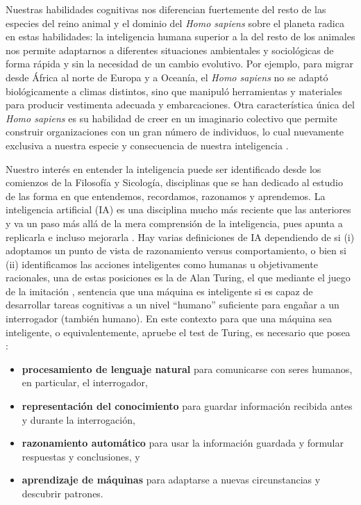 Nuestras habilidades cognitivas nos diferencian fuertemente del resto de las especies del reino animal y el dominio del \emph{Homo sapiens} sobre el planeta radica en estas habilidades: la inteligencia humana superior a la del resto de los animales nos permite adaptarnos a diferentes situaciones ambientales y sociológicas de forma rápida y sin la necesidad de un cambio evolutivo. Por ejemplo, para migrar desde África al norte de Europa y a Oceanía, el \emph{Homo sapiens} no se adaptó biológicamente a climas distintos, sino que manipuló herramientas y materiales para producir vestimenta adecuada y embarcaciones. Otra característica única del \emph{Homo sapiens} es su habilidad de creer en un imaginario colectivo que permite construir organizaciones con un gran número de individuos, lo cual nuevamente exclusiva a nuestra especie y consecuencia de nuestra inteligencia \cite{harari}. 

Nuestro interés en entender la inteligencia puede ser identificado desde los comienzos de la Filosofía y Sicología, disciplinas que se han dedicado al estudio de las forma en que entendemos, recordamos, razonamos y aprendemos. La inteligencia artificial (IA) es una disciplina mucho más reciente que las anteriores y va un paso más allá de la mera comprensión de la inteligencia, pues apunta a replicarla e incluso mejorarla \cite{bostrom_2014}. Hay varias definiciones de IA dependiendo de si (i) adoptamos un punto de vista de razonamiento versus comportamiento, o bien si (ii) identificamos las acciones inteligentes como humanas u objetivamente racionales, una de estas posiciones es la de Alan Turing, el que mediante el juego de la imitación \cite{turing_1950}, sentencia que una máquina es inteligente si es capaz de desarrollar tareas cognitivas a un nivel “humano” suficiente para engañar a un interrogador (también humano). En este contexto para que una máquina sea inteligente, o equivalentemente, apruebe el test de Turing, es necesario que posea \cite{russell_norvig_2009}:  
\begin{itemize}
	\item \textbf{procesamiento de lenguaje natural} para comunicarse con seres humanos, en particular, el interrogador,
	\item \textbf{representación del conocimiento} para guardar información recibida antes y durante la interrogación,
	\item \textbf{razonamiento automático} para usar la información guardada y formular respuestas y conclusiones, y
	\item \textbf{aprendizaje de máquinas} para adaptarse a nuevas circunstancias y descubrir patrones.
\end{itemize}

